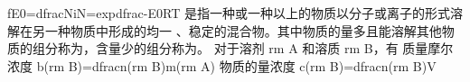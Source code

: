 {}f\markdownRendererUnderscore{}\markdownRendererLeftBrace{}E\markdownRendererUnderscore{}0\markdownRendererRightBrace{}=\markdownRendererBackslash{}dfrac\markdownRendererLeftBrace{}N\markdownRendererUnderscore{}i\markdownRendererRightBrace{}\markdownRendererLeftBrace{}N\markdownRendererRightBrace{}=\markdownRendererBackslash{}exp\markdownRendererLeftBrace{}\markdownRendererBackslash{}dfrac\markdownRendererLeftBrace{}-E\markdownRendererUnderscore{}0\markdownRendererRightBrace{}\markdownRendererLeftBrace{}RT\markdownRendererRightBrace{}\markdownRendererRightBrace{}\markdownRendererSoftLineBreak
{}\markdownRendererDollarSign{}\markdownRendererDollarSign{}\markdownRendererInterblockSeparator
{}
\markdownRendererSectionEnd 
\markdownRendererSectionEnd 
\markdownRendererSectionEnd \markdownRendererSectionBegin
{}\markdownRendererInterblockSeparator
{}是指一种或一种以上的物质以分子或离子的形式溶解在另一种物质中形成的均一 、稳定的混合物。其中物质的量多且能溶解其他物质的组分称为，含量少的组分称为。\markdownRendererInterblockSeparator
{}\markdownRendererSectionBegin
{}\markdownRendererInterblockSeparator
{}对于溶剂 \markdownRendererDollarSign{}\markdownRendererBackslash{}rm A\markdownRendererDollarSign{} 和溶质 \markdownRendererDollarSign{}\markdownRendererBackslash{}rm B\markdownRendererDollarSign{}，有\markdownRendererInterblockSeparator
{}\markdownRendererOlBeginTight
{}质量摩尔浓度 \markdownRendererDollarSign{}b(\markdownRendererLeftBrace{}\markdownRendererBackslash{}rm B\markdownRendererRightBrace{})=\markdownRendererBackslash{}dfrac\markdownRendererLeftBrace{}n(\markdownRendererLeftBrace{}\markdownRendererBackslash{}rm B\markdownRendererRightBrace{})\markdownRendererRightBrace{}\markdownRendererLeftBrace{}m(\markdownRendererLeftBrace{}\markdownRendererBackslash{}rm A\markdownRendererRightBrace{})\markdownRendererRightBrace{}\markdownRendererDollarSign{}\markdownRendererOlItemEnd 
{}物质的量浓度 \markdownRendererDollarSign{}c(\markdownRendererLeftBrace{}\markdownRendererBackslash{}rm B\markdownRendererRightBrace{})=\markdownRendererBackslash{}dfrac\markdownRendererLeftBrace{}n(\markdownRendererLeftBrace{}\markdownRendererBackslash{}rm B\markdownRendererRightBrace{})\markdownRendererRightBrace{}\markdownRendererLeftBrace{}V\markdownRendererRightBrace{}\markdownRendererDollarSign{}\markdownRendererOlItemEnd 
